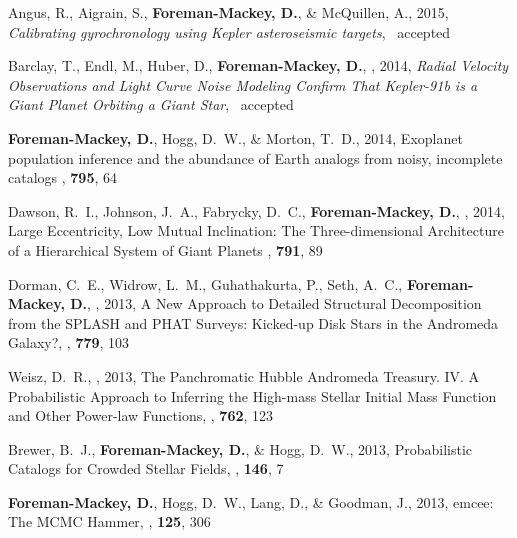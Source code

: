 \item Angus, R., Aigrain, S., {\bf Foreman-Mackey, D.}, \& McQuillen, A., 2015,
    \emph{Calibrating gyrochronology using Kepler asteroseismic targets},
    \mnras\ accepted 

\item Barclay, T., Endl, M.,  Huber, D., {\bf Foreman-Mackey, D.}, \etal, 2014,
    \emph{Radial Velocity Observations and Light Curve Noise Modeling Confirm
          That Kepler-91b is a Giant Planet Orbiting a Giant Star},
    \apj\ accepted 

\item {\bf Foreman-Mackey, D.}, Hogg, D.~W., \& Morton, T.~D., 2014,
        {Exoplanet population inference and the abundance of Earth analogs
         from noisy, incomplete catalogs}
    \apj, \textbf{795}, 64

\item Dawson, R.~I., Johnson,  J.~A., Fabrycky, D.~C.,
    {\bf Foreman-Mackey, D.}, \etal, 2014,
        {Large Eccentricity, Low Mutual Inclination: The Three-dimensional
         Architecture of a Hierarchical System of Giant Planets}
    \apj, \textbf{791}, 89

\item Dorman, C.~E., Widrow, L.~M., Guhathakurta, P., Seth, A.~C.,
    {\bf Foreman-Mackey, D.}, \etal, 2013,
        {A New Approach to Detailed Structural Decomposition from the SPLASH
         and PHAT Surveys: Kicked-up Disk Stars in the Andromeda Galaxy?},
    \apj, \textbf{779}, 103

\item Weisz, D.~R., \etal, 2013,
        {The Panchromatic Hubble Andromeda Treasury. IV. A Probabilistic
         Approach to Inferring the High-mass Stellar Initial Mass Function and
         Other Power-law Functions},
    \apj, \textbf{762}, 123

\item Brewer, B.~J., {\bf Foreman-Mackey, D.}, \& Hogg, D.~W., 2013,
        {Probabilistic Catalogs for Crowded Stellar Fields},
    \aj, \textbf{146}, 7

\item {\bf Foreman-Mackey, D.}, Hogg, D.~W., Lang, D., \& Goodman, J., 2013,
        {emcee: The MCMC Hammer},
    \pasp, \textbf{125}, 306
